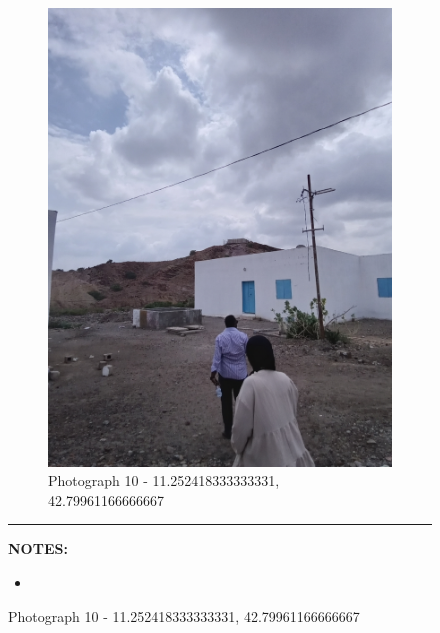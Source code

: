 \documentclass[12pt, letterpaper]{article}
\begin{document}
\begin{figure}[h]
{{                \begin{subfigure}{\linewidth}
                    \centering
                    \includegraphics[width=0.37\textheight, angle=-90]{photos/6.png}
                    \captionsetup{width=0.8\linewidth}
                    \caption{Photograph 10 - 11.252418333333331, 42.79961166666667}
                \end{subfigure}
                    \vspace{1mm}
                    \hrule
                \begin{minipage}[c][4.5cm][t]{1\textwidth} 
                    \begin{minipage}[t][2cm][t]{0.5\textwidth} 
	 				\vspace{2mm}
					\centering
					\textbf{\small{NOTES:}} \\ 
					\raggedright 
					\begin{itemize}
            					\item \footnotesize{}

\end{itemize}
\end{minipage}
\end{minipage}}}
\end{figure}
\end{document}
